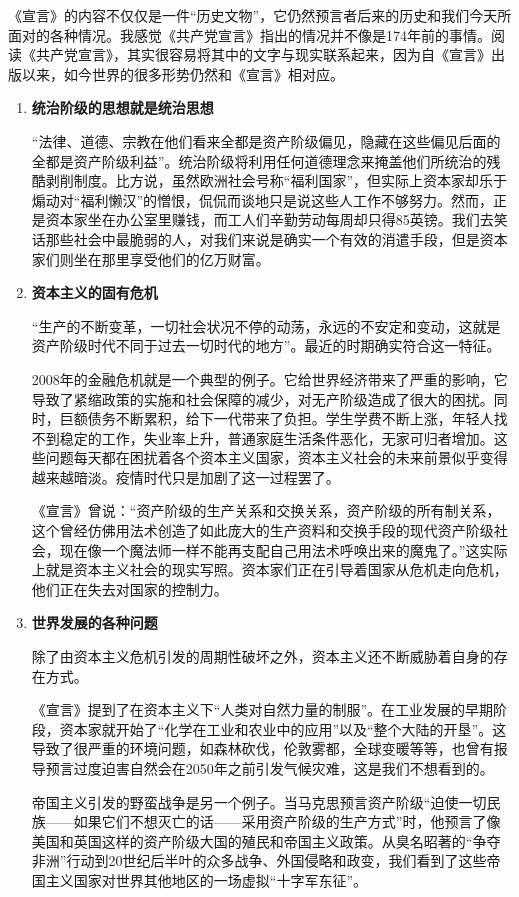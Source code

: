 \documentclass[a4paper,11pt,UTF8]{article}
\begin{document}
《宣言》的内容不仅仅是一件“历史文物”，它仍然预言者后来的历史和我们今天所面对的各种情况。我感觉《共产党宣言》指出的情况并不像是174年前的事情。阅读《共产党宣言》，其实很容易将其中的文字与现实联系起来，因为自《宣言》出版以来，如今世界的很多形势仍然和《宣言》相对应。
\begin{enumerate}
	\item \textbf{统治阶级的思想就是统治思想}
	
	“法律、道德、宗教在他们看来全都是资产阶级偏见，隐藏在这些偏见后面的全都是资产阶级利益”。统治阶级将利用任何道德理念来掩盖他们所统治的残酷剥削制度。比方说，虽然欧洲社会号称“福利国家”，但实际上资本家却乐于煽动对“福利懒汉”的憎恨，侃侃而谈地只是说这些人工作不够努力。然而，正是资本家坐在办公室里赚钱，而工人们辛勤劳动每周却只得85英镑。我们去笑话那些社会中最脆弱的人，对我们来说是确实一个有效的消遣手段，但是资本家们则坐在那里享受他们的亿万财富。
	
	\item \textbf{资本主义的固有危机}
	
	“生产的不断变革，一切社会状况不停的动荡，永远的不安定和变动，这就是资产阶级时代不同于过去一切时代的地方”。最近的时期确实符合这一特征。
	
	2008年的金融危机就是一个典型的例子。它给世界经济带来了严重的影响，它导致了紧缩政策的实施和社会保障的减少，对无产阶级造成了很大的困扰。同时，巨额债务不断累积，给下一代带来了负担。学生学费不断上涨，年轻人找不到稳定的工作，失业率上升，普通家庭生活条件恶化，无家可归者增加。这些问题每天都在困扰着各个资本主义国家，资本主义社会的未来前景似乎变得越来越暗淡。疫情时代只是加剧了这一过程罢了。
	
	《宣言》曾说：“资产阶级的生产关系和交换关系，资产阶级的所有制关系，这个曾经仿佛用法术创造了如此庞大的生产资料和交换手段的现代资产阶级社会，现在像一个魔法师一样不能再支配自己用法术呼唤出来的魔鬼了。”这实际上就是资本主义社会的现实写照。资本家们正在引导着国家从危机走向危机，他们正在失去对国家的控制力。
	
	\item \textbf{世界发展的各种问题}
	
	除了由资本主义危机引发的周期性破坏之外，资本主义还不断威胁着自身的存在方式。
	
	《宣言》提到了在资本主义下“人类对自然力量的制服”。在工业发展的早期阶段，资本家就开始了“化学在工业和农业中的应用”以及“整个大陆的开垦”。这导致了很严重的环境问题，如森林砍伐，伦敦雾都，全球变暖等等，也曾有报导预言过度迫害自然会在2050年之前引发气候灾难，这是我们不想看到的。
	
	帝国主义引发的野蛮战争是另一个例子。当马克思预言资产阶级“迫使一切民族——如果它们不想灭亡的话——采用资产阶级的生产方式”时，他预言了像美国和英国这样的资产阶级大国的殖民和帝国主义政策。从臭名昭著的“争夺非洲”行动到20世纪后半叶的众多战争、外国侵略和政变，我们看到了这些帝国主义国家对世界其他地区的一场虚拟“十字军东征”。
	
\end{enumerate}
\end{document}
